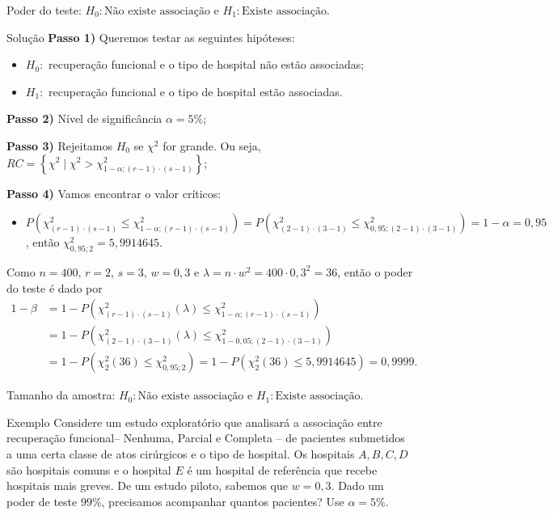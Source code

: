 \documentclass[9pt]{beamer}
\begin{document}
\begin{frame}{Poder do teste: $H_0:\mbox{Não existe associação}$ e $H_1:\mbox{Existe associação} $.}

\small
\begin{block}{Solução}
	\textbf{Passo 1)} Queremos testar as seguintes hipóteses:
	\begin{itemize}
		\item $H_0:$ recuperação funcional e o tipo de hospital não estão associadas;
		\item $H_1:$ recuperação funcional e o tipo de hospital estão associadas.
	\end{itemize}

	\textbf{Passo 2)} Nível de significância $\alpha=5\%$;
	
	\textbf{Passo 3)} Rejeitamos $H_0$ se $\chi^2$ for grande. Ou seja, $RC =\left\{ \chi^2 \mid \chi^2 > \chi^2_{1-\alpha; (r-1)\cdot (s-1)} \right\}$;
	
	\textbf{Passo 4)} Vamos encontrar o valor críticos:
	\begin{itemize}
		\item $P\left( \chi^2_{(r-1)\cdot (s-1)} \leq \chi^2_{1-\alpha;(r-1)\cdot (s-1)} \right) = P\left( \chi^2_{(2-1)\cdot (3-1)} \leq \chi^2_{0,95;(2-1)\cdot (3-1)} \right) = \allowbreak 1-\alpha=0,95$, então $\chi^2_{0,95;2} = 5,9914645$.
	\end{itemize}

	Como $n=400$, $r=2$, $s=3$, $w=0,3$ e $\lambda = n \cdot w^2 = 400 \cdot 0,3^2 = 36$, então o poder do teste é dado por
	\begin{align*}
		1-\beta &= 1 - P\left( \chi_{(r-1)\cdot (s-1)}^2(\lambda) \leq \chi_{1-\alpha; (r-1)\cdot (s-1)}^2 \right)\\
		&= 1 - P\left( \chi_{(2-1)\cdot (3-1)}^2(\lambda) \leq \chi_{1-0,05; (2-1)\cdot (3-1)}^2 \right)\\
		&= 1 - P\left( \chi_{2}^2(36) \leq \chi_{0,95; 2}^2 \right) = 1 - P\left( \chi_{2}^2(36) \leq 5,9914645 \right) = 0,9999.
	\end{align*}
\end{block}
\normalsize

\end{frame}

\begin{frame}{Tamanho da amostra: $H_0:\mbox{Não existe associação}$ e $H_1:\mbox{Existe associação} $.}

\large
\begin{block}{Exemplo}
	Considere um estudo exploratório que analisará a associação entre recuperação funcional-- Nenhuma, Parcial e Completa -- de pacientes submetidos a uma certa classe de atos cirúrgicos e o tipo de hospital. Os hospitais $A, B, C, D$ são hospitais comuns e o hospital $E$ é um hospital de referência que recebe hospitais mais greves. De um estudo piloto, sabemos que $w= 0,3$. Dado um poder de teste $99\%$, precisamos acompanhar quantos pacientes? Use $\alpha=5\%$.
\end{block}
\normalsize

\end{frame}
\end{document}
